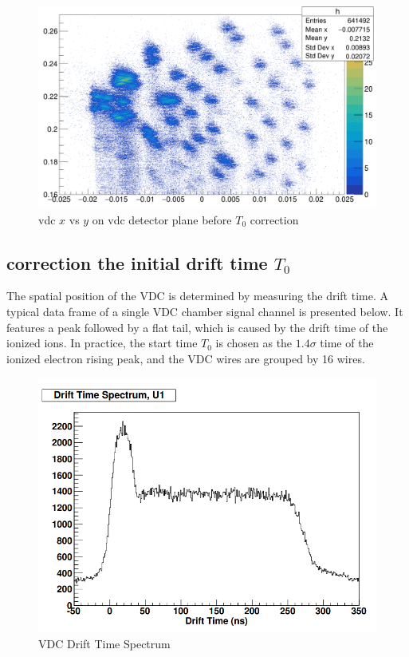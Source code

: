 \begin{figure}[!htbp]
    \centering
    \includegraphics[width=\textwidth]{images/chap4/vdc_t0_before_correction.png}
    \caption{vdc $x$ vs $y$ on vdc detector plane before $T_0$ correction}
    \label{fig:vdc_t0_before_correction}
\end{figure}
\subsection{correction the initial drift time $T_0$}

The spatial position of the VDC is determined by measuring the drift time. A typical data frame of a single VDC chamber signal channel is presented below. It features a peak followed by a flat tail, which is caused by the drift time of the ionized ions. In practice, the start time $T_0$ is chosen as the $1.4\sigma$ time of the ionized electron rising peak, and the VDC wires are grouped by 16 wires.

\begin{figure}[!htbp]
\centering
\includegraphics[scale = 0.25]{images/chap4/vdc_signals.png}
\caption{VDC Drift Time Spectrum}
\label{fig:vdc_dift_time_spectrum}
\end{figure}

